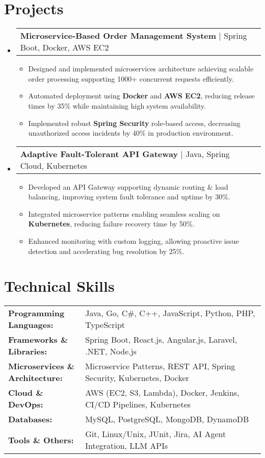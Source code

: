 \documentclass[letterpaper,11pt]{article}
\makeatletter
\newcommand{\resumeItem}[1]{
  \item\footnotesize{
    {#1 \vspace{-2pt}}
  }
}
\newcommand{\resumeProjectHeading}[2]{
    \item
    \begin{tabular*}{1.001\textwidth}{l@{\extracolsep{\fill}}r}
      \small#1 & \textbf{\small #2}\\
    \end{tabular*}\vspace{-7pt}
}
\newcommand{\resumeSubHeadingListStart}{\begin{itemize}[leftmargin=0pt, label={}]}
\newcommand{\resumeSubHeadingListEnd}{\end{itemize}}
\newcommand{\resumeItemListStart}{\begin{itemize}[leftmargin=*]}
\newcommand{\resumeItemListEnd}{\end{itemize}\vspace{-5pt}}
\makeatother
\begin{document}
\section{Projects}
    \vspace{-5pt}
    \resumeSubHeadingListStart
      \resumeProjectHeading
          {\textbf{Microservice-Based Order Management System} | Spring Boot, Docker, AWS EC2}
          {}
          \resumeItemListStart
              \resumeItem{Designed and implemented microservices architecture achieving scalable order processing supporting 1000+ concurrent requests efficiently.}
              \resumeItem{Automated deployment using \textbf{Docker} and \textbf{AWS EC2}, reducing release times by 35\% while maintaining high system availability.}
              \resumeItem{Implemented robust \textbf{Spring Security} role-based access, decreasing unauthorized access incidents by 40\% in production environment.}
          \resumeItemListEnd
          \vspace{-16pt}
      \resumeProjectHeading
          {\textbf{Adaptive Fault-Tolerant API Gateway} | Java, Spring Cloud, Kubernetes}
          {}
          \resumeItemListStart
              \resumeItem{Developed an API Gateway supporting dynamic routing & load balancing, improving system fault tolerance and uptime by 30\%.}
              \resumeItem{Integrated microservice patterns enabling seamless scaling on \textbf{Kubernetes}, reducing failure recovery time by 50\%.}
              \resumeItem{Enhanced monitoring with custom logging, allowing proactive issue detection and accelerating bug resolution by 25\%.}
          \resumeItemListEnd
    \resumeSubHeadingListEnd
\vspace{-10pt}
\section{Technical Skills}
        \vspace{-14pt}
        \begin{table}[h]
            \footnotesize
            \begin{tabular}{p{0.3\linewidth} p{0.7\linewidth}}
                \textbf{Programming Languages:} & Java, Go, C\#, C++, JavaScript, Python, PHP, TypeScript \\
                \textbf{Frameworks \& Libraries:} & Spring Boot, React.js, Angular.js, Laravel, .NET, Node.js \\
                \textbf{Microservices \& Architecture:} & Microservice Patterns, REST API, Spring Security, Kubernetes, Docker \\
                \textbf{Cloud \& DevOps:} & AWS (EC2, S3, Lambda), Docker, Jenkins, CI/CD Pipelines, Kubernetes \\
                \textbf{Databases:} & MySQL, PostgreSQL, MongoDB, DynamoDB \\
                \textbf{Tools \& Others:} & Git, Linux/Unix, JUnit, Jira, AI Agent Integration, LLM APIs \\
            \end{tabular}
        \end{table}
\end{document}
